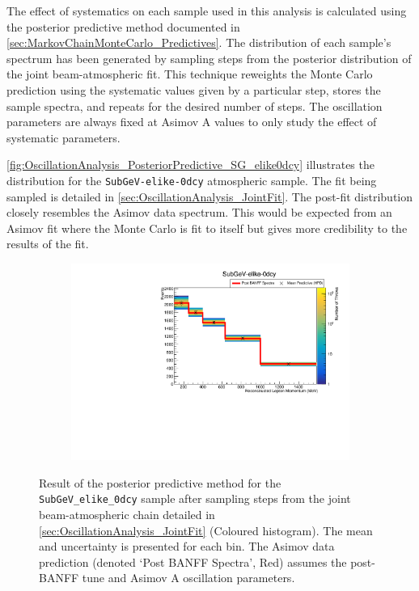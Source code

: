 The effect of systematics on each sample used in this analysis is calculated using the posterior predictive method documented in \autoref{sec:MarkovChainMonteCarlo_Predictives}. The distribution of each sample's spectrum has been generated by sampling  steps from the posterior distribution of the joint beam-atmospheric fit. This technique reweights the Monte Carlo prediction using the systematic values given by a particular step, stores the sample spectra, and repeats for the desired number of steps. The oscillation parameters are always fixed at Asimov A values to only study the effect of systematic parameters.

\autoref{fig:OscillationAnalysis_PosteriorPredictive_SG_elike0dcy} illustrates the distribution for the \texttt{SubGeV-elike-0dcy} atmospheric sample. The fit being sampled is detailed in \autoref{sec:OscillationAnalysis_JointFit}. The post-fit distribution closely resembles the Asimov data spectrum. This would be expected from an Asimov fit where the Monte Carlo is fit to itself but gives more credibility to the results of the fit.

\begin{figure}[h]
  \begin{subfigure}[t]{0.98\textwidth}
    \includegraphics[width=\textwidth, trim={0mm 0mm 0mm 0mm}, clip,page=1]{Figures/OA/Predictive_AllSyst.pdf}
  \end{subfigure}
  \caption{Result of the posterior predictive method for the \texttt{SubGeV\_elike\_0dcy} sample after sampling  steps from the joint beam-atmospheric chain detailed in \autoref{sec:OscillationAnalysis_JointFit} (Coloured histogram). The mean and uncertainty is presented for each bin. The Asimov data prediction (denoted `Post BANFF Spectra', Red) assumes the post-BANFF tune and Asimov A oscillation parameters.}
  \label{fig:OscillationAnalysis_PosteriorPredictive_SG_elike0dcy}
\end{figure}

